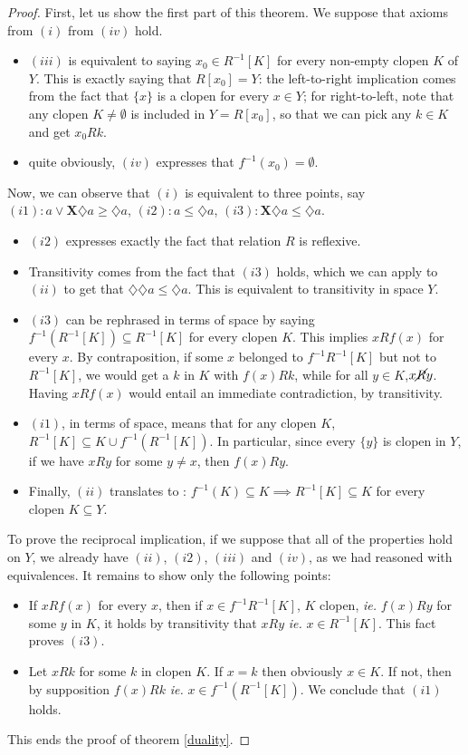 \documentclass[11pt]{article}
\begin{document}
\begin{proof}
    First, let us show the first part of this theorem. We suppose that axioms from $(i)$ from $(iv)$ hold.
\begin{itemize}
    \item $(iii)$ is equivalent to saying $x_0 \in R^{-1}[K]$ for every non-empty clopen $K$ of $Y$. This is exactly saying that $R[x_0] = Y$: the left-to-right implication comes from the fact that $\{ x\}$ is a clopen for every $x \in Y$; for right-to-left, note that any clopen $K \neq \emptyset$ is included in $Y = R[x_0]$, so that we can pick any $k \in K$ and get $x_0 R k$.
    \item quite obviously, $(iv)$ expresses that $f^{-1}(x_0) =  \emptyset$.
\end{itemize}
Now, we can observe that $(i)$ is equivalent to three points, say $(i1):a \lor \mathbf{X}\diamondsuit a \geq \diamondsuit a$, $(i2): a \leq \diamondsuit a$, $(i3): \mathbf{X}\diamondsuit a \leq \diamondsuit a$.
\begin{itemize}
    \item $(i2)$ expresses exactly the fact that relation $R$ is reflexive.
    \item Transitivity comes from the fact that $(i3)$ holds, which we can apply to $(ii)$ to get that $\diamondsuit \diamondsuit a \leq \diamondsuit a$. This is equivalent to transitivity in space $Y$.
    \item $(i3)$ can be rephrased in terms of space by saying $f^{-1}(R^{-1}[K])\subseteq R^{-1}[K]$ for every clopen $K$. This implies $xRf(x)$ for every $x$. By contraposition, if some $x$ belonged to $f^{-1}R^{-1}[K]$ but not to $R^{-1}[K]$, we would get a $k$ in $K$ with $f(x) R k$, while for all $y \in K$,$x \cancel{R} y$. Having $x R f(x)$ would entail an immediate contradiction, by transitivity.
    \item $(i1)$, in terms of space, means that for any clopen $K$, $R^{-1}[K] \subseteq K \cup f^{-1}(R^{-1}[K])$. In particular, since every $\{ y \}$ is clopen in $Y$, if we have $xRy$ for some $y \neq x$, then $f(x)Ry$.
    \item Finally, $(ii)$ translates to : $f^{-1}(K)\subseteq K \implies R^{-1}[K]\subseteq K$ for every clopen $K \subseteq Y$.
\end{itemize}
To prove the reciprocal implication, if we suppose that all of the properties hold on $Y$, we already have $(ii)$, $(i2)$, $(iii)$ and $(iv)$, as we had reasoned with equivalences. It remains to show only the following points:
\begin{itemize}
    \item If $x R f(x)$ for every $x$, then if $x \in f^{-1}R^{-1}[K]$, $K$ clopen, \emph{ie.} $f(x) R y$ for some $y$ in $K$, it holds by transitivity that $x R y$ \emph{ie.} $x \in R^{-1}[K]$. This fact proves $(i3)$.
    \item Let $xRk$ for some $k$ in clopen $K$. If $x=k$ then obviously $x\in K$. If not, then by supposition $f(x)Rk$ \emph{ie.} $x\in f^{-1}(R^{-1}[K])$. We conclude that $(i1)$ holds.
\end{itemize}
This ends the proof of theorem \ref{duality}.
\end{proof}


\end{document}
